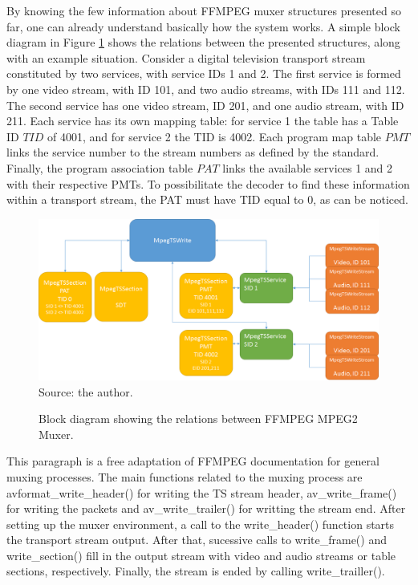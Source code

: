 \documentclass[
	12pt,				%
	openright,			%
	twoside,			%
	a4paper,			%
	brazil,
	french,				%
	english
	]{abntex2}
\begin{document}
By knowing the few information about FFMPEG muxer structures presented so far, one can already understand basically how the system works. A simple block diagram in Figure \ref{fig:diagrama_estruturas_ffmpeg} shows the relations between the presented structures, along with an example situation. Consider a digital television transport stream constituted by two services, with service IDs 1 and 2. The first service is formed by one video stream, with ID 101, and two audio streams, with IDs 111 and 112. The second service has one video stream, ID 201, and one audio stream, with ID 211. Each service has its own mapping table: for service 1 the table has a Table ID \(TID\) of 4001, and for service 2 the TID is 4002. Each program map table \(PMT\) links the service number to the stream numbers as defined by the standard. Finally, the program association table \(PAT\) links the available services 1 and 2 with their respective PMTs. To possibilitate the decoder to find these information within a transport stream, the PAT must have TID equal to 0, as can be noticed.

\begin{figure}
\centering
\caption{Block diagram showing the relations between FFMPEG MPEG2 Muxer.}
\includegraphics[width=1\linewidth]{figuras/diagrama_estruturas_ffmpeg.png}
\\Source: the author.
\label{fig:diagrama_estruturas_ffmpeg}
\end{figure}

This paragraph is a free adaptation of FFMPEG documentation for general muxing processes. The main functions related to the muxing process are avformat\_write\_header() for writing the TS stream header, av\_write\_frame() for writing the packets and av\_write\_trailer() for writting the stream end. After setting up the muxer environment, a call to the write\_header() function starts the transport stream output. After that, sucessive calls to write\_frame() and write\_section() fill in the output stream with video and audio streams or table sections, respectively. Finally, the stream is ended by calling write\_trailler().
\end{document}
